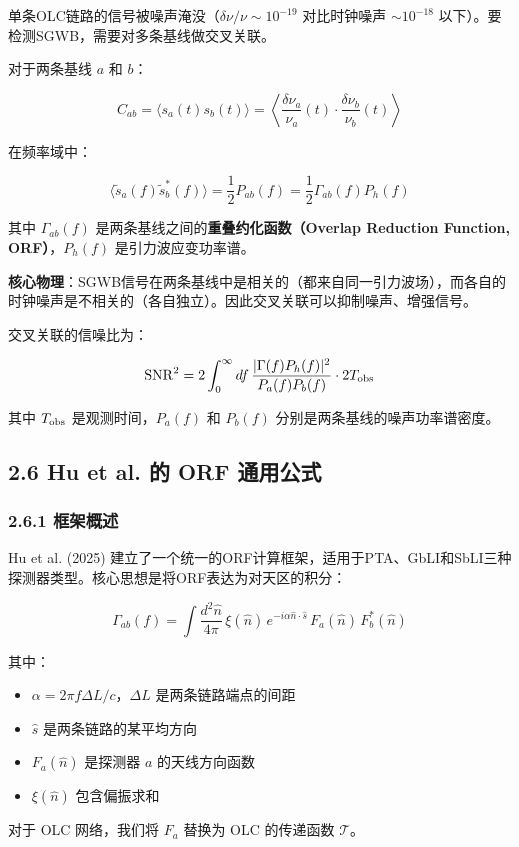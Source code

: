 \documentclass[12pt,a4paper]{article}
\begin{document}
单条OLC链路的信号被噪声淹没（$\delta\nu/\nu \sim 10^{-19}$ 对比时钟噪声 $\sim 10^{-18}$ 以下）。要检测SGWB，需要对多条基线做交叉关联。

对于两条基线 $a$ 和 $b$：

$$C_{ab} = \langle s_a(t) s_b(t)\rangle = \left\langle \frac{\delta\nu_a}{\nu_a}(t) \cdot \frac{\delta\nu_b}{\nu_b}(t)\right\rangle$$

在频率域中：

$$\langle \tilde{s}_a(f) \tilde{s}_b^*(f)\rangle = \frac{1}{2} P_{ab}(f) = \frac{1}{2} \Gamma_{ab}(f) P_h(f)$$

其中 $\Gamma_{ab}(f)$ 是两条基线之间的\textbf{重叠约化函数（Overlap Reduction Function, ORF）}，$P_h(f)$ 是引力波应变功率谱。

\textbf{核心物理}：SGWB信号在两条基线中是相关的（都来自同一引力波场），而各自的时钟噪声是不相关的（各自独立）。因此交叉关联可以抑制噪声、增强信号。

交叉关联的信噪比为：

$${\rm SNR}^2 = 2 \int_0^\infty df\, \frac{|\Gamma(f) P_h(f)|^2}{P_a(f) P_b(f)} \cdot 2T_{\rm obs}$$

其中 $T_{\rm obs}$ 是观测时间，$P_a(f)$ 和 $P_b(f)$ 分别是两条基线的噪声功率谱密度。

\subsection{2.6 Hu et al. 的 ORF 通用公式}


\subsubsection{2.6.1 框架概述}


Hu et al. (2025) 建立了一个统一的ORF计算框架，适用于PTA、GbLI和SbLI三种探测器类型。核心思想是将ORF表达为对天区的积分：

$$\Gamma_{ab}(f) = \int \frac{d^2\hat{n}}{4\pi}\, \xi(\hat{n})\, e^{-i\alpha \hat{n}\cdot\hat{s}}\, F_a(\hat{n})\, F_b^*(\hat{n})$$

其中：
\begin{itemize}
  \item $\alpha = 2\pi f \Delta L/c$，$\Delta L$ 是两条链路端点的间距
  \item $\hat{s}$ 是两条链路的某平均方向
  \item $F_a(\hat{n})$ 是探测器 $a$ 的天线方向函数
  \item $\xi(\hat{n})$ 包含偏振求和
\end{itemize}
对于 OLC 网络，我们将 $F_a$ 替换为 OLC 的传递函数 $\mathcal{T}$。
\end{document}
